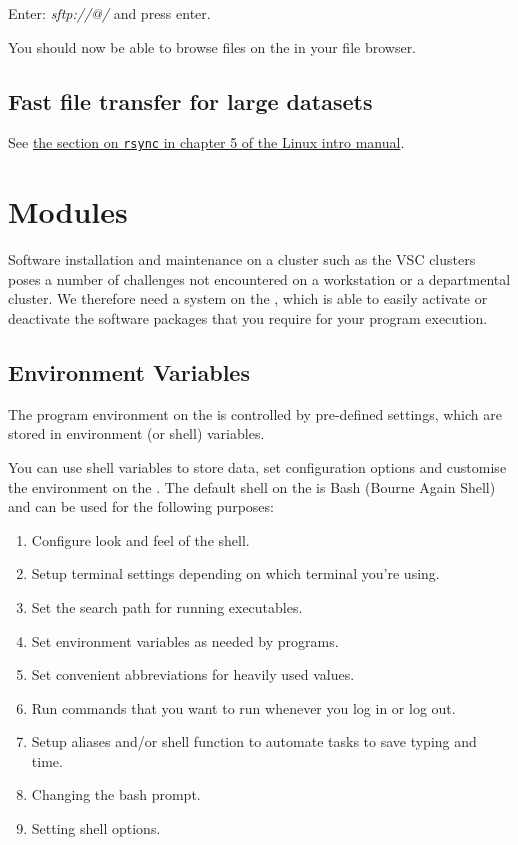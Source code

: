   Enter: \emph{sftp://\userid{}@\loginnode/} and press enter.

  You should now be able to browse files on the \hpc in your file browser.
\fi

\subsection{Fast file transfer for large datasets}

See \href{\LinuxManualURL#sec:rsync}{the section on \texttt{rsync} in chapter 5 of the Linux intro manual}.

\section{Modules}
\label{sec:modules}

Software installation and maintenance on a \hpc cluster such as the VSC
clusters poses a number of challenges not encountered on a workstation or a
departmental cluster. We therefore need a system on the \hpc, which is able
to easily activate or deactivate the software packages that you require for
your program execution.

\subsection{Environment Variables}

The program environment on the \hpc is controlled by pre-defined settings,
which are stored in environment (or shell) variables.

You can use shell variables to store data, set configuration options and
customise the environment on the \hpc. The default shell
on the \hpc is Bash (Bourne Again Shell) and can be used for the
following purposes:

\begin{enumerate}
\item  Configure look and feel of the shell.
\item  Setup terminal settings depending on which terminal you're using.
\item  Set the search path for running executables.
\item  Set environment variables as needed by programs.
\item  Set convenient abbreviations for heavily used values.
\item  Run commands that you want to run whenever you log in or log out.
\item  Setup aliases and/or shell function to automate tasks to save typing and time.
\item  Changing the bash prompt.
\item  Setting shell options.
\end{enumerate}


